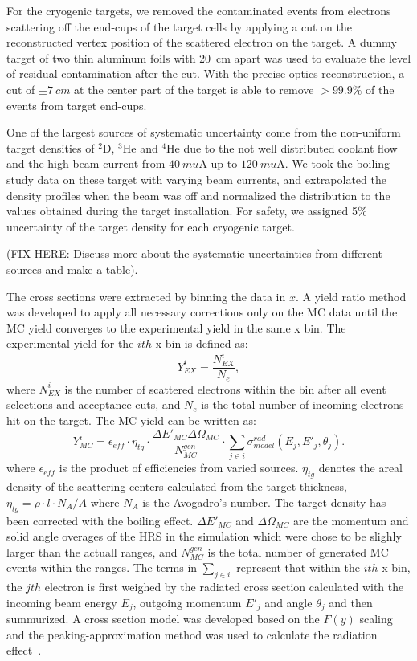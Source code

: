 For the cryogenic targets, we removed the contaminated events from electrons scattering off the end-cups of the target cells by applying a cut on the reconstructed vertex position of the scattered electron on the target. A dummy target of two thin aluminum foils with 20~cm apart was used to evaluate the level of residual contamination after the cut. With the precise optics reconstruction, a cut of $\pm 7~cm$ at the center part of the target is able to remove $>99.9\%$ of the events from target end-cups.

One of the largest sources of systematic uncertainty come from the non-uniform target densities of $\mathrm{^{2}D}$, $\mathrm{^{3}He}$ and $\mathrm{^{4}He}$ due to the not well distributed coolant flow and the high beam current from $40~mu\mathrm{A}$ up to $120~mu\mathrm{A}$.  We took the boiling study data on these target with varying beam currents, and extrapolated the density profiles when the beam was off and normalized the distribution to the values obtained during the target installation. For safety, we assigned 5\% uncertainty of the target density for each cryogenic target. 

(FIX-HERE: Discuss more about the systematic uncertainties from different sources and make a table).

The cross sections were extracted by binning the data in $x$. A yield ratio method was developed to apply all necessary corrections only on the MC data until the MC yield converges to the experimental yield in the same x bin. The experimental yield for the $ith$ x bin is defined as:
\begin{equation}
Y^{i}_{EX} = \frac{N^{i}_{EX}}{N_{e}},
	\end{equation}
	where $N^{i}_{EX}$ is the number of scattered electrons within the bin after all event selections and acceptance cuts, and $N_{e}$ is the total number of incoming electrons hit on the target. The MC yield can be written as:
	\begin{equation}
	Y^{i}_{MC} = \epsilon_{eff} \cdot \eta_{tg}\cdot \frac{\Delta E'_{MC}\Delta \Omega_{MC}} {N_{MC}^{gen}}\cdot\sum_{j\in i}\sigma^{rad}_{model}(E_{j},E'_{j},\theta_{j}) .
	\label{eqymc}
	\end{equation}
	where $\epsilon_{eff}$ is the product of efficiencies from varied sources. $\eta_{tg}$ denotes the areal density of the scattering centers calculated from the target thickness, $\eta_{tg}=\rho\cdot l \cdot N_{A}/A$ where $N_{A}$ is the Avogadro's number. The target density has been corrected with the boiling effect. $\Delta E'_{MC}$ and $\Delta\Omega_{MC}$ are the momentum and solid angle overages of the HRS in the simulation which were chose to be slighly larger than the actuall ranges, and $N_{MC}^{gen}$ is the total number of generated MC events within the ranges. The terms in $\sum_{j\in i}$ represent that within the $ith$ x-bin, the $jth$ electron is first weighed by the radiated cross section calculated with the incoming beam energy $E_{j}$, outgoing momentum $E'_{j}$ and angle $\theta_{j}$ and then summurized. A cross section model was developed based on the $F(y)$ scaling and the peaking-approximation method was used to calculate the radiation effect~\cite{zye_thesis}. 

